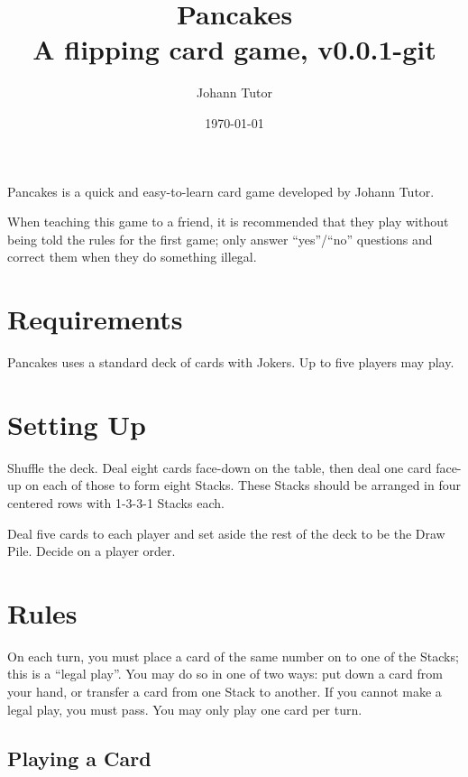 \documentclass{article}
\newcommand\theversion{0.0.1-git}
\begin{document}
\title{Pancakes\\ \large A flipping card game, v\theversion}
\author{Johann Tutor}
\date{\today}
\maketitle

Pancakes is a quick and easy-to-learn card game developed by Johann Tutor.

When teaching this game to a friend, it is recommended that they play without being told the rules for the first game;
only answer ``yes''/``no'' questions and correct them when they do something illegal.

\tableofcontents

\newpage

\section{Requirements}

Pancakes uses a standard deck of cards with Jokers.
Up to five players may play.

\section{Setting Up}
\label{sec:setup}

Shuffle the deck. Deal eight cards face-down on the table, then deal one card face-up on each of those to form eight Stacks.
These Stacks should be arranged in four centered rows with 1-3-3-1 Stacks each.

Deal five cards to each player and set aside the rest of the deck to be the Draw Pile. Decide on a player order.

\section{Rules}

On each turn, you must place a card of the same number on to one of the Stacks; this is a ``legal play''. You may do so in one of two ways: put down a card from your hand, or transfer a card from one Stack to another. If you cannot make a legal play, you must pass. You may only play one card per turn.

\subsection{Playing a Card}
\label{sec:playcard}
\end{document}
